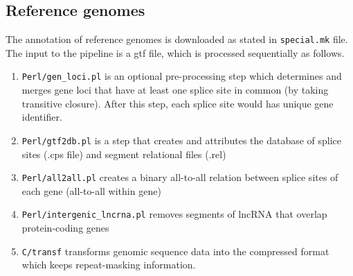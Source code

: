 \documentclass{article}
\begin{document}
\subsection{Reference genomes}
The annotation of reference genomes is downloaded as stated in {\tt special.mk} file. The input to the pipeline is a gtf 
file, which is processed sequentially as follows.
\begin{enumerate}
\item {\tt Perl/gen\_loci.pl} is an optional pre-processing step which determines and merges gene loci that have at least 
one splice site in common (by taking transitive closure). After this step, each splice site would has unique gene identifier.
\item {\tt Perl/gtf2db.pl} is a step that creates and attributes the database of splice sites (.cps file) and segment relational files (.rel)
\item {\tt Perl/all2all.pl} creates a binary all-to-all relation between splice sites of each gene (all-to-all within gene)
\item {\tt Perl/intergenic\_lncrna.pl} removes segments of lncRNA that overlap protein-coding genes
\item {\tt C/transf} transforms genomic sequence data into the compressed format which keeps repeat-masking information.
\end{enumerate}
\end{document}
